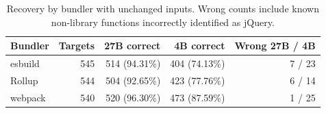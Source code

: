 \begin{table}[htbp]
\caption{Recovery by bundler with unchanged inputs. Wrong counts include known non-library functions incorrectly identified as jQuery.}
\label{tab:exp5-build-comparison}
\centering\small
\begin{tabular}{lrrrr}
\toprule
Bundler & Targets & 27B correct & 4B correct & Wrong 27B / 4B\\
\midrule
esbuild & 545 & 514 (94.31\%) & 404 (74.13\%) & 7 / 23\\
Rollup & 544 & 504 (92.65\%) & 423 (77.76\%) & 6 / 14\\
webpack & 540 & 520 (96.30\%) & 473 (87.59\%) & 1 / 25\\
\bottomrule
\end{tabular}
\end{table}
